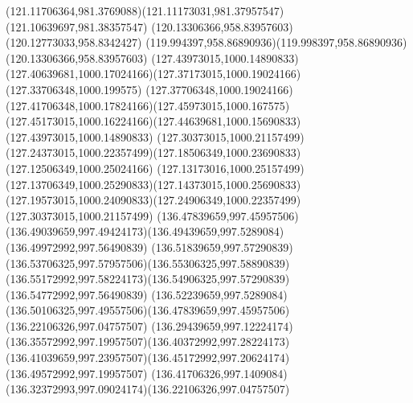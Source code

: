 {{  \curveto(121.11706364,981.3769088)(121.11173031,981.37957547)(121.10639697,981.38357547)
  \moveto(120.13306366,958.83957603)
  \lineto(120.12773033,958.8342427)
  \curveto(119.994397,958.86890936)(119.998397,958.86890936)(120.13306366,958.83957603)
  \moveto(127.43973015,1000.14890833)
  \curveto(127.40639681,1000.17024166)(127.37173015,1000.19024166)(127.33706348,1000.199575)
  \curveto(127.37706348,1000.19024166)(127.41706348,1000.17824166)(127.45973015,1000.167575)
  \curveto(127.45173015,1000.16224166)(127.44639681,1000.15690833)(127.43973015,1000.14890833)
  \moveto(127.30373015,1000.21157499)
  \curveto(127.24373015,1000.22357499)(127.18506349,1000.23690833)(127.12506349,1000.25024166)
  \curveto(127.13173016,1000.25157499)(127.13706349,1000.25290833)(127.14373015,1000.25690833)
  \curveto(127.19573015,1000.24090833)(127.24906349,1000.22357499)(127.30373015,1000.21157499)
  \moveto(136.47839659,997.45957506)
  \curveto(136.49039659,997.49424173)(136.49439659,997.5289084)(136.49972992,997.56490839)
  \curveto(136.51839659,997.57290839)(136.53706325,997.57957506)(136.55306325,997.58890839)
  \curveto(136.55172992,997.58224173)(136.54906325,997.57290839)(136.54772992,997.56490839)
  \curveto(136.52239659,997.5289084)(136.50106325,997.49557506)(136.47839659,997.45957506)
  \moveto(136.22106326,997.04757507)
  \curveto(136.29439659,997.12224174)(136.35572992,997.19957507)(136.40372992,997.28224173)
  \curveto(136.41039659,997.23957507)(136.45172992,997.20624174)(136.49572992,997.19957507)
  \curveto(136.41706326,997.1409084)(136.32372993,997.09024174)(136.22106326,997.04757507)
}
}
{
}
{
}
{
}
{
}
